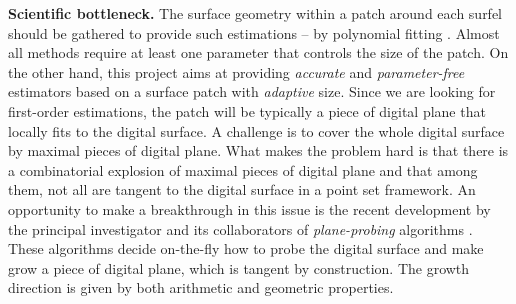 \noindent\textbf{Scientific bottleneck.}
The surface geometry within a patch around each surfel should be gathered to provide such estimations
-- \eg by polynomial fitting \cite{Cazals2005,Cazals2008}.
Almost all methods require at least one parameter that controls the size of the patch.  
On the other hand, this project aims at providing \emph{accurate} and \emph{parameter-free} estimators
based on a surface patch with \emph{adaptive} size.
Since we are looking for first-order estimations, the patch will be typically a piece of digital plane
that locally fits to the digital surface. %
A challenge is to cover the whole digital surface by maximal pieces of digital plane. 
What makes the problem hard is that there is a combinatorial explosion
of maximal pieces of digital plane \cite{Sivignon2009} and that among them,
not all are tangent to the digital surface in a point set framework.  
An opportunity to make a breakthrough in this issue is the recent development
by the principal investigator and its collaborators of \emph{plane-probing}
algorithms \cite{LPRTCS2016, LPRDGCI2016, LPRJMIV2017}. These algorithms decide
on-the-fly how to probe the digital surface and make grow a piece of digital plane,
which is tangent by construction. The growth direction is given by both arithmetic and geometric properties.

